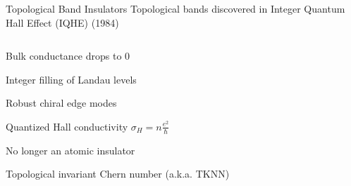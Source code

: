 \begin{frame}{Topological Band Insulators}
\vskip-1.5cm
Topological bands discovered in Integer Quantum Hall Effect (IQHE) (1984)
\begin{columns}[T]
\begin{column}[T]{0.65\textwidth}
\bi
\item Bulk conductance drops to 0
\item Integer filling of Landau levels
\item Robust chiral edge modes
\item Quantized Hall conductivity $\sigma_H = n\frac{e^2}{\hbar}$
\item No longer an atomic insulator
\item<2-> Topological invariant Chern number (a.k.a. TKNN)
\ei
\end{column}
\begin{column}[T]{0.35\textwidth}
\end{column}
\end{columns}
\end{frame}
